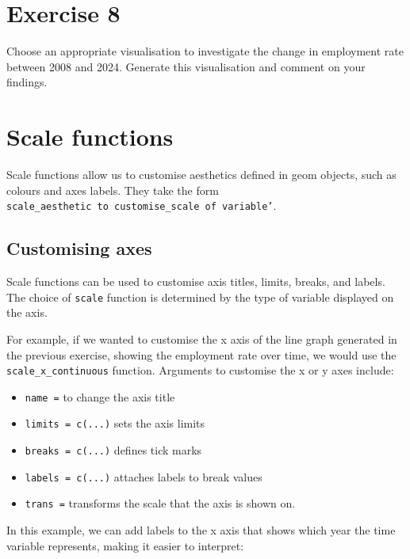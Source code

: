 \documentclass[
  letterpaper,
  DIV=11,
  numbers=noendperiod]{scrreprt}
\providecommand{\tightlist}{%
  \setlength{\itemsep}{0pt}\setlength{\parskip}{0pt}}\usepackage{longtable,booktabs,array}
\begin{document}
\section{Exercise 8}\label{exercise-8}

Choose an appropriate visualisation to investigate the change in
employment rate between 2008 and 2024. Generate this visualisation and
comment on your findings.

\section{Scale functions}\label{scale-functions}

Scale functions allow us to customise aesthetics defined in geom
objects, such as colours and axes labels. They take the form
\texttt{scale\_\textquotesingle{}aesthetic\ to\ customise\textquotesingle{}\_\textquotesingle{}scale\ of\ variable’}.

\subsection{Customising axes}\label{customising-axes}

Scale functions can be used to customise axis titles, limits, breaks,
and labels. The choice of \texttt{scale} function is determined by the
type of variable displayed on the axis.

For example, if we wanted to customise the x axis of the line graph
generated in the previous exercise, showing the employment rate over
time, we would use the \texttt{scale\_x\_continuous} function. Arguments
to customise the x or y axes include:

\begin{itemize}
\tightlist
\item
  \texttt{name\ =} to change the axis title
\item
  \texttt{limits\ =\ c(...)} sets the axis limits
\item
  \texttt{breaks\ =\ c(...)} defines tick marks
\item
  \texttt{labels\ =\ c(...)} attaches labels to break values
\item
  \texttt{trans\ =} transforms the scale that the axis is shown on.
\end{itemize}

In this example, we can add labels to the x axis that shows which year
the time variable represents, making it easier to interpret:
\end{document}

